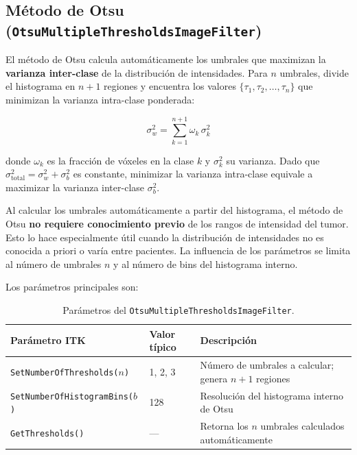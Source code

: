 \documentclass[12pt, a4paper]{article}
\begin{document}
\subsection{Método de Otsu (\texttt{OtsuMultipleThresholdsImageFilter})}

El método de Otsu \cite{otsu1979} calcula automáticamente los umbrales que maximizan la
\textbf{varianza inter-clase} de la distribución de intensidades. Para $n$ umbrales,
divide el histograma en $n+1$ regiones y encuentra los valores $\{\tau_1, \tau_2,
\ldots, \tau_n\}$ que minimizan la varianza intra-clase ponderada:

\begin{equation}
  \sigma^2_w = \sum_{k=1}^{n+1} \omega_k \, \sigma^2_k
  \label{eq:otsu}
\end{equation}

donde $\omega_k$ es la fracción de vóxeles en la clase $k$ y $\sigma^2_k$ su varianza.
Dado que $\sigma^2_{\text{total}} = \sigma^2_w + \sigma^2_b$ es constante, minimizar la
varianza intra-clase equivale a maximizar la varianza inter-clase $\sigma^2_b$.

\begin{tcolorbox}[infostyle, title={Ventaja del método de Otsu}]
Al calcular los umbrales automáticamente a partir del histograma, el método de Otsu
\textbf{no requiere conocimiento previo} de los rangos de intensidad del tumor. Esto lo
hace especialmente útil cuando la distribución de intensidades no es conocida a priori o
varía entre pacientes. La influencia de los parámetros se limita al número de umbrales
$n$ y al número de bins del histograma interno.
\end{tcolorbox}

Los parámetros principales son:

\begin{table}[H]
\centering
\renewcommand{\arraystretch}{1.3}
\begin{tabular}{llp{7cm}}
\toprule
\textbf{Parámetro ITK} & \textbf{Valor típico} & \textbf{Descripción} \\
\midrule
\texttt{SetNumberOfThresholds($n$)} & 1, 2, 3 & Número de umbrales a calcular; genera $n+1$ regiones \\
\texttt{SetNumberOfHistogramBins($b$)} & 128 & Resolución del histograma interno de Otsu \\
\texttt{GetThresholds()} & — & Retorna los $n$ umbrales calculados automáticamente \\
\bottomrule
\end{tabular}
\caption{Parámetros del \texttt{OtsuMultipleThresholdsImageFilter}.}
\label{tab:otsu_params}
\end{table}
\end{document}
